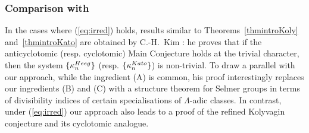 \documentclass[10pt,reqno]{amsart}
\numberwithin{equation}{section}
\theoremstyle{plain}
\theoremstyle{definition}
\theoremstyle{definition}
\theoremstyle{plain}
\theoremstyle{plain}
\theoremstyle{plain}
\theoremstyle{plain}
\theoremstyle{plain}
\theoremstyle{plain}
\newcommand{\Z}{\mathbb{Z}}
\newcommand{\p}{\mathfrak{P}}
\begin{document}
\subsubsection*{Comparison with \cite{kim2,kim}} 
In the cases where (\ref{eq:irred}) holds, results similar to Theorems~\ref{thmintroKoly} and~\ref{thmintroKato} are obtained by C.-H.~Kim \cite{kim2,kim}: he proves that if the anticyclotomic (resp. cyclotomic) Main Conjecture holds at the trivial character, then the system $\{\kappa_n^{\rm Heeg}\}$ (resp. $\{\kappa_n^{\rm Kato}\}$) is non-trivial. To draw a parallel with our approach, while the ingredient (A) is common, 
his proof interestingly replaces our ingredients (B) and (C) with a structure theorem for Selmer groups in terms of divisibility indices of certain specialisations of $\Lambda$-adic classes.   %
In contrast, under (\ref{eq:irred}) our approach
also 
leads to a proof of the refined Kolyvagin conjecture  %
and its cyclotomic analogue. %
%
%
\end{document}
